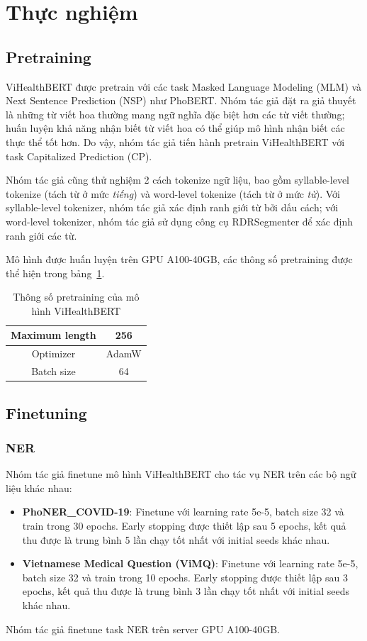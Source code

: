 \section{Thực nghiệm}
\subsection{Pretraining}
ViHealthBERT được pretrain với các task Masked Language Modeling (MLM) và Next Sentence Prediction (NSP) như PhoBERT. Nhóm tác giả đặt ra giả thuyết là những từ viết hoa thường mang ngữ nghĩa đặc biệt hơn các từ viết thường;  huấn luyện khả năng nhận biết từ viết hoa có thể giúp mô hình nhận biết các thực thể tốt hơn. Do vậy, nhóm tác giả tiến hành pretrain ViHealthBERT với task Capitalized Prediction (CP). 

Nhóm tác giả cũng thử nghiệm 2 cách tokenize ngữ liệu, bao gồm syllable-level tokenize (tách từ ở mức \textit{tiếng}) và word-level tokenize (tách từ ở mức \textit{từ}). Với syllable-level tokenizer, nhóm tác giả xác định ranh giới từ bởi dấu cách; với word-level tokenizer, nhóm tác giả sử dụng công cụ RDRSegmenter\cite{NguyenNVDJ2018} để xác định ranh giới các từ.

Mô hình được huấn luyện trên GPU A100-40GB, các thông số pretraining được thể hiện trong bảng~\ref{tab:pretraining-hyperparams}.

\begin{table}
\centering
\begin{tabular}{|c|c|}
\hline
Maximum length & 256 \\ \hline
Optimizer & AdamW \\ \hline
Batch size & 64 \\ \hline
\end{tabular}
\caption{Thông số pretraining của mô hình ViHealthBERT\cite{minh-EtAl:2022:LREC}}
\label{tab:pretraining-hyperparams}
\end{table}

\subsection{Finetuning}
\subsubsection{NER}
Nhóm tác giả finetune mô hình ViHealthBERT cho tác vụ NER trên các bộ ngữ liệu khác nhau:
\begin{itemize}
\item \textbf{PhoNER\_COVID-19}: Finetune với learning rate 5e-5, batch size 32 và train trong 30 epochs. Early stopping được thiết lập sau 5 epochs, kết quả thu được là trung bình 5 lần chạy tốt nhất với initial seeds khác nhau.
\item \textbf{Vietnamese Medical Question (ViMQ)}: Finetune với learning rate 5e-5, batch size 32 và train trong 10 epochs. Early stopping được thiết lập sau 3 epochs, kết quả thu được là trung bình 3 lần chạy tốt nhất với initial seeds khác nhau.
\end{itemize}
Nhóm tác giả finetune task NER trên server GPU A100-40GB.

